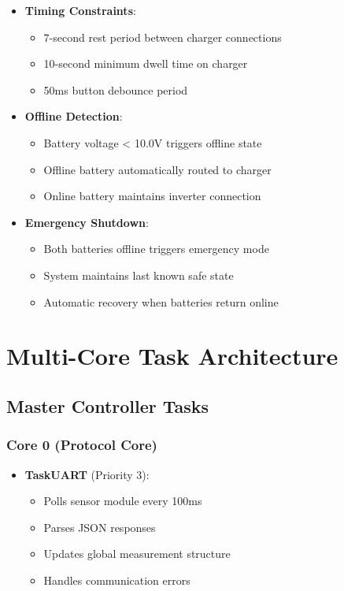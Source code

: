 \documentclass[11pt,a4paper]{article}
\begin{document}
\begin{itemize}
    \item \textbf{Timing Constraints}:
    \begin{itemize}
        \item 7-second rest period between charger connections
        \item 10-second minimum dwell time on charger
        \item 50ms button debounce period
    \end{itemize}
    
    \item \textbf{Offline Detection}:
    \begin{itemize}
        \item Battery voltage < 10.0V triggers offline state
        \item Offline battery automatically routed to charger
        \item Online battery maintains inverter connection
    \end{itemize}
    
    \item \textbf{Emergency Shutdown}:
    \begin{itemize}
        \item Both batteries offline triggers emergency mode
        \item System maintains last known safe state
        \item Automatic recovery when batteries return online
    \end{itemize}
\end{itemize}

\section{Multi-Core Task Architecture}

\subsection{Master Controller Tasks}

\subsubsection{Core 0 (Protocol Core)}
\begin{itemize}
    \item \textbf{TaskUART} (Priority 3):
    \begin{itemize}
        \item Polls sensor module every 100ms
        \item Parses JSON responses
        \item Updates global measurement structure
        \item Handles communication errors
    \end{itemize}
\end{itemize}
\end{document}
